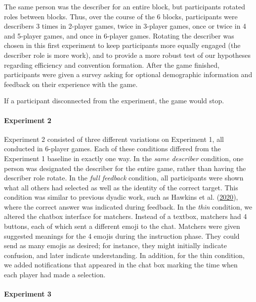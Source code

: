 \documentclass[
  english,
]{article}
\begin{document}
The same person was the describer for an entire block, but participants rotated roles between blocks.
Thus, over the course of the 6 blocks, participants were describers 3 times in 2-player games, twice in 3-player games, once or twice in 4 and 5-player games, and once in 6-player games.
Rotating the describer was chosen in this first experiment to keep participants more equally engaged (the describer role is more work), and to provide a more robust test of our hypotheses regarding efficiency and convention formation.
After the game finished, participants were given a survey asking for optional demographic information and feedback on their experience with the game.

If a participant disconnected from the experiment, the game would stop.

\paragraph{Experiment 2}

Experiment 2 consisted of three different variations on Experiment 1, all conducted in 6-player games.
Each of these conditions differed from the Experiment 1 baseline in exactly one way.
In the \emph{same describer} condition, one person was designated the describer for the entire game, rather than having the describer role rotate.
In the \emph{full feedback} condition, all participants were shown what all others had selected as well as the identity of the correct target.
This condition was similar to previous dyadic work, such as Hawkins et al. (\protect\hyperlink{ref-hawkins2020}{2020}), where the correct answer was indicated during feedback.
In the \emph{thin} condition, we altered the chatbox interface for matchers.
Instead of a textbox, matchers had 4 buttons, each of which sent a different emoji to the chat. Matchers were given suggested meanings for the 4 emojis during the instruction phase. They could send as many emojis as desired; for instance, they might initially indicate confusion, and later indicate understanding. In addition, for the thin condition, we added notifications that appeared in the chat box marking the time when each player had made a selection.

\paragraph{Experiment 3}
\end{document}
